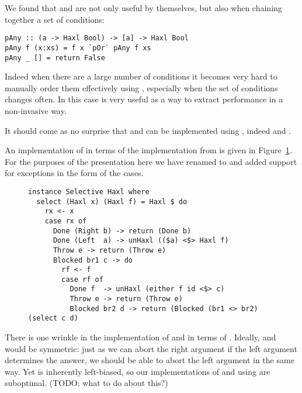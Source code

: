 We found that  and  are not only useful by
themselves, but also when chaining together a set of conditions:

\begin{verbatim}
pAny :: (a -> Haxl Bool) -> [a] -> Haxl Bool
pAny f (x:xs) = f x `pOr` pAny f xs
pAny _ [] = return False
\end{verbatim}

Indeed when there are a large number of conditions it becomes very
hard to manually order them effectively using , especially
when the set of conditions changes often. In this case  is
very useful as a way to extract performance in a non-invasive way.

It should come as no surprise that  and  can be
implemented using , indeed  and
.

An implementation of  in terms of the \Haxl implementation
from \citet{haxl} is given in Figure~\ref{fig-haxl-select}.  For the
purposes of the presentation here we have renamed  to
 and added support for exceptions in the form of the
 cases.

\begin{figure}
\begin{verbatim}
instance Selective Haxl where
  select (Haxl x) (Haxl f) = Haxl $ do
    rx <- x
    case rx of
      Done (Right b) -> return (Done b)
      Done (Left  a) -> unHaxl (($a) <$> Haxl f)
      Throw e -> return (Throw e)
      Blocked br1 c -> do
        rf <- f
        case rf of
          Done f  -> unHaxl (either f id <$> c)
          Throw e -> return (Throw e)
          Blocked br2 d -> return (Blocked (br1 <> br2) (select c d)
\end{verbatim}
\label{fig-haxl-select}
\end{figure}

There is one wrinkle in the implementation of  and 
in terms of . Ideally,  and  would be
symmetric: just as we can abort the right argument if the left
argument determines the answer, we should be able to abort the left
argument in the same way. Yet  is inherently left-biased,
so our implementations of  and  using  are
suboptimal.  (TODO: what to do about this?)
